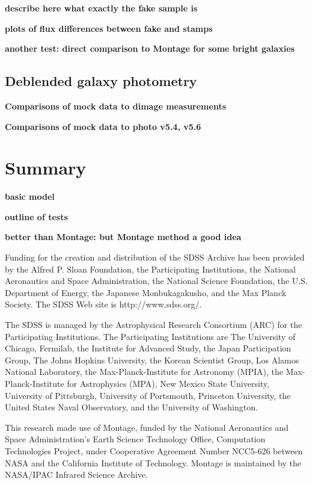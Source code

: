 \documentclass[10pt,preprint]{aastex}
\begin{document}
{\bf describe here what exactly the fake sample is}

{\bf plots of flux differences between fake and stamps}

{\bf another test: direct comparison to Montage for some bright
galaxies}

\subsection{Deblended galaxy photometry}
\label{sec:deblendgal}

{\bf Comparisons of mock data to dimage measurements}

{\bf Comparisons of mock data to photo v5.4, v5.6}

\section{ Summary}

{\bf basic model}

{\bf outline of tests}

{\bf better than Montage: but Montage method a good idea}

\acknowledgments

Funding for the creation and distribution of the SDSS Archive has been
provided by the Alfred P. Sloan Foundation, the Participating
Institutions, the National Aeronautics and Space Administration, the
National Science Foundation, the U.S. Department of Energy, the
Japanese Monbukagakusho, and the Max Planck Society. The SDSS Web site
is http://www.sdss.org/.

The SDSS is managed by the Astrophysical Research Consortium (ARC) for
the Participating Institutions. The Participating Institutions are The
University of Chicago, Fermilab, the Institute for Advanced Study, the
Japan Participation Group, The Johns Hopkins University, the Korean
Scientist Group, Los Alamos National Laboratory, the
Max-Planck-Institute for Astronomy (MPIA), the Max-Planck-Institute
for Astrophysics (MPA), New Mexico State University, University of
Pittsburgh, University of Portsmouth, Princeton University, the United
States Naval Observatory, and the University of Washington.

This research made use of Montage, funded by the National Aeronautics and
Space Administration's Earth Science Technology Office, Computation
Technologies Project, under Cooperative Agreement Number NCC5-626 between
NASA and the California Institute of Technology. Montage is maintained by
the NASA/IPAC Infrared Science Archive.




\newpage


%
\end{document}
